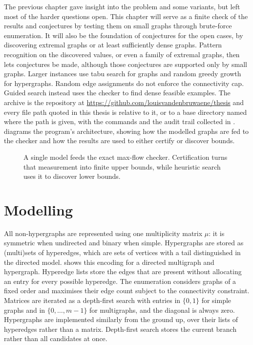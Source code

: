 
The previous chapter gave insight into the problem and some variants, but left most of the harder questions open.
This chapter will serve as a finite check of the results and conjectures by testing them on small graphs through brute-force enumeration.
It will also be the foundation of conjectures for the open cases, by discovering extremal graphs or at least sufficiently dense graphs.
Pattern recognition on the discovered values, or even a family of extremal graphs, then lets conjectures be made, although those conjectures are supported only by small graphs.
Larger instances use tabu search for graphs and random greedy growth for hypergraphs.
Random edge assignments do not enforce the connectivity cap. Guided search instead uses the checker to find dense feasible examples.
The archive is the repository at \url{https://github.com/louisvandenbruwaene/thesis} and every file path quoted in this thesis is relative to it, or to a base directory named where the path is given, with the commands and the audit trail collected in .
 diagrams the program's architecture, showing how the modelled graphs are fed to the checker and how the results are used to either certify or discover bounds.
\begin{figure}[ht]
\centering
\spinediagram
\caption{A single model feeds the exact max-flow checker. Certification turns that measurement into finite upper bounds, while heuristic search uses it to discover lower bounds.}
\label{fig:spine}
\end{figure}

\section{Modelling}
All non-hypergraphs are represented using one multiplicity matrix $\mu$: it is symmetric when undirected and binary when simple.
Hypergraphs are stored as (multi)sets of hyperedges, which are sets of vertices with a tail distinguished in the directed model.
 shows this encoding for a directed multigraph and hypergraph.
Hyperedge lists store the edges that are present without allocating an entry for every possible hyperedge.
The enumeration considers graphs of a fixed order and maximises their edge count subject to the connectivity constraint.
Matrices are iterated as a depth-first search with entries in $\{0,1\}$ for simple graphs and in $\{0,\ldots,m-1\}$ for multigraphs, and the diagonal is always zero.
Hypergraphs are implemented similarly from the ground up, over their lists of hyperedges rather than a matrix.
Depth-first search stores the current branch rather than all candidates at once.


